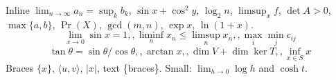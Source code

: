\documentclass{article}
\begin{document}
Inline $\lim_{n\to\infty} a_n = \sup_k b_k$, $\sin x + \cos^2 y$, $\log_2 n$, $\limsup_{x} f$, $\det A > 0$, $\max\{a,b\}$, $\Pr(X)$, $\gcd(m,n)$, $\exp x$, $\ln(1+x)$.
\[ \lim_{x\to 0} \sin x = 1, , \liminf_{n} x_n \le \limsup_{n} x_n, , \max_{i} \min_{j} c_{ij} \]
\[ \tan\theta = \sin\theta/\cos\theta, , \arctan x, , \dim V + \dim\ker T, , \inf_{x\in S} x \]
Braces $\{x\}$, $\langle u, v \rangle$, $\vert x \vert$, text \{braces\}.
{\small Small: $\lim_{h\to0} \log h$ and $\cosh t$.}
\end{document}
